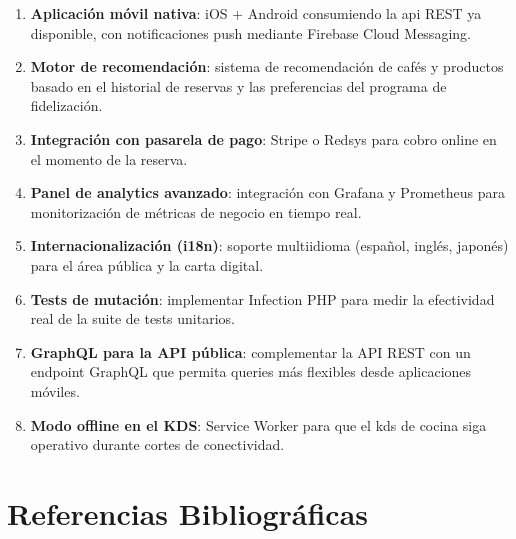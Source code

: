 \documentclass[12pt,a4paper,twoside,openright]{report}
\begin{document}
\begin{enumerate}
  \item \textbf{Aplicación móvil nativa}: iOS + Android consumiendo la \gls{api} REST
    ya disponible, con notificaciones push mediante Firebase Cloud Messaging.
  \item \textbf{Motor de recomendación}: sistema de recomendación de cafés y productos
    basado en el historial de reservas y las preferencias del programa de fidelización.
  \item \textbf{Integración con pasarela de pago}: Stripe o Redsys para cobro online
    en el momento de la reserva.
  \item \textbf{Panel de analytics avanzado}: integración con Grafana y Prometheus
    para monitorización de métricas de negocio en tiempo real.
  \item \textbf{Internacionalización (i18n)}: soporte multiidioma (español, inglés,
    japonés) para el área pública y la carta digital.
  \item \textbf{Tests de mutación}: implementar Infection PHP para medir la efectividad
    real de la suite de tests unitarios.
  \item \textbf{GraphQL para la API pública}: complementar la API REST con un endpoint
    GraphQL que permita queries más flexibles desde aplicaciones móviles.
  \item \textbf{Modo offline en el KDS}: Service Worker para que el \gls{kds} de cocina
    siga operativo durante cortes de conectividad.
\end{enumerate}

\chapter{Referencias Bibliográficas}
\label{ch:refs}

\printbibliography[heading=none]

\end{document}
